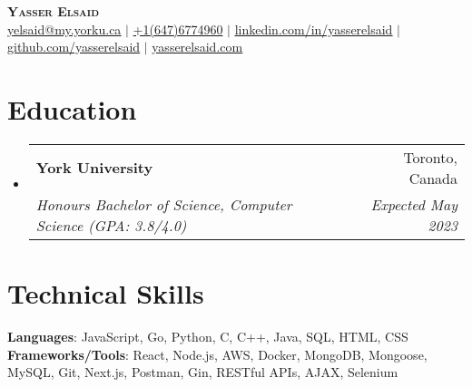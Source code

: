 \documentclass[letterpaper,11pt]{article}
\makeatletter
\newcommand{\resumeSubheading}[4]{
  \vspace{-2pt}\item
    \begin{tabular*}{0.97\textwidth}[t]{l@{\extracolsep{\fill}}r}
      \textbf{#1} & #2 \\
      \textit{\small#3} & \textit{\small #4} \\
    \end{tabular*}\vspace{-7pt}
}
\newcommand{\resumeSubHeadingListStart}{\begin{itemize}[leftmargin=0.15in, label={}]}
\newcommand{\resumeSubHeadingListEnd}{\end{itemize}}
\makeatother
\begin{document}

\begin{center}
    \textbf{\Huge \scshape Yasser Elsaid} \\ \vspace{1pt}
     \href{mailto:yelsaid@my.yorku.ca}{\underline{yelsaid@my.yorku.ca}} $|$ 
     \underline{+1(647)6774960} $|$ 
    \href{https://linkedin.com/in/yasserelsaid}{\underline{linkedin.com/in/yasserelsaid}} $|$
    \href{https://github.com/yasserelsaid}{\underline{github.com/yasserelsaid}} $|$
    \href{https://yasserelsaid.com}{\underline{yasserelsaid.com}}

\end{center}


\section{Education}
  \resumeSubHeadingListStart
    \resumeSubheading
      {York University}{Toronto, Canada}
      {Honours Bachelor of Science, Computer Science (GPA: 3.8/4.0)}{Expected May 2023}
   
  \resumeSubHeadingListEnd

\section{Technical Skills}
\begin{itemize}[leftmargin=0.15in, label={}]
   \small{\item{
    \textbf{Languages}{: JavaScript, Go, Python, C, C++, Java, SQL, HTML, CSS} \\
    \textbf{Frameworks/Tools}{: React, Node.js, AWS, Docker, MongoDB, Mongoose, MySQL, Git, Next.js, Postman, Gin, RESTful APIs, AJAX, Selenium } \\
   }}
\end{itemize}


\end{document}
